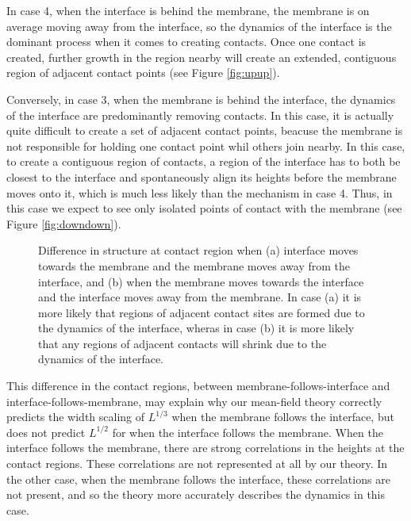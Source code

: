 \documentclass[a4paper,10pt]{article}
\newcommand{\fref}[1]{Figure \ref{#1}}
\begin{document}
In case 4, when the interface is behind the membrane, the membrane is on average moving away from the interface, so the dynamics of the interface is the dominant process when it comes to creating contacts. Once one contact is created, further growth in the region nearby will create an extended, contiguous region of adjacent contact points (see \fref{fig:upup}).

Conversely, in case 3, when the membrane is behind the interface, the dynamics of the interface are predominantly removing contacts. In this case, it is actually quite difficult to create a set of adjacent contact points, beacuse the membrane is not responsible for holding one contact point whil others join nearby. In this case, to create a contiguous region of contacts, a region of the interface has to both be closest to the interface and spontaneously align its heights before the membrane moves onto it, which is much less likely than the mechanism in case 4. Thus, in this case we expect to see only isolated points of contact with the membrane (see \fref{fig:downdown}). 
\begin{figure}[h!]
 \centering
 \caption{Difference in structure at contact region when (a) interface moves towards the membrane and the membrane moves away from the interface, and (b) when the membrane moves towards the interface and the interface moves away from the membrane. In case (a) it is more likely that regions of adjacent contact sites are formed due to the dynamics of the interface, wheras in case (b) it is more likely that any regions of adjacent contacts will shrink due to the dynamics of the interface.}
\end{figure}

This difference in the contact regions, between membrane-follows-interface and interface-follows-membrane, may explain why our mean-field theory correctly predicts the width scaling of $L^{1/3}$ when the membrane follows the interface, but does not predict $L^{1/2}$ for when the interface follows the membrane. When the interface follows the membrane, there are strong correlations in the heights at the contact regions. These correlations are not represented at all by our theory. In the other case, when the membrane follows the interface, these correlations are not present, and so the theory more accurately describes the dynamics in this case.
\end{document}
